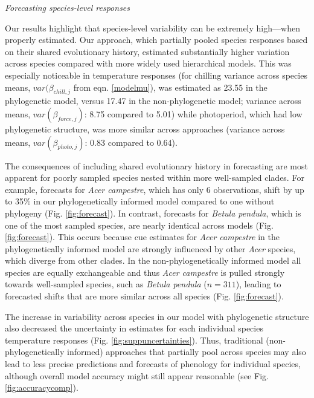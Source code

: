 \documentclass[11pt]{article}
\begin{document}
\emph{Forecasting species-level responses}

Our results highlight that species-level variability can be extremely high---when properly estimated. Our approach, which partially pooled species responses based on their shared evolutionary history, estimated substantially higher variation across species compared with more widely used hierarchical models. This was especially noticeable in temperature responses (for chilling variance across species means, $var(\beta_{chill,j}$ from eqn. \ref{modelmu}), was estimated as 23.55 in the phylogenetic model, versus 17.47 in the non-phylogenetic model; variance across means, $var(\beta_{force,j})$: 8.75 compared to 5.01) while photoperiod, which had low phylogenetic structure, was more similar across approaches (variance across means, $var(\beta_{photo,j})$: 0.83 compared to 0.64). %

The consequences of including shared evolutionary history in forecasting are most apparent for poorly sampled species nested within more well-sampled clades. For example, forecasts for \emph{Acer campestre}, which has only 6 observations, shift by up to 35\% in our phylogenetically informed model compared to one without phylogeny (Fig. \ref{fig:forecast}). In contrast, forecasts for \emph{Betula pendula}, which is one of the most sampled species, are nearly identical across models (Fig. \ref{fig:forecast}). This occurs because cue estimates for \emph{Acer campestre} in the phylogenetically informed model are strongly influenced by other \emph{Acer} species, which diverge from other clades. In the non-phylogenetically informed model all species are equally exchangeable and thus \emph{Acer campestre} is pulled strongly towards well-sampled species, such as \emph{Betula pendula} ($n = 311$), leading to forecasted shifts that are more similar across all species (Fig. \ref{fig:forecast}). 

The increase in variability across species in our model with phylogenetic structure also decreased the uncertainty in estimates for each individual species temperature responses (Fig. \ref{fig:suppuncertainties}). Thus, traditional (non-phylogenetically informed) approaches that partially pool across species  \cite[most hierarchical models in ecology, e.g.,][]{flynn2018,ettinger2020} may also lead to less precise predictions and forecasts of phenology for individual species, although overall model accuracy might still appear reasonable (see Fig. \ref{fig:accuracycomp}).
\end{document}
